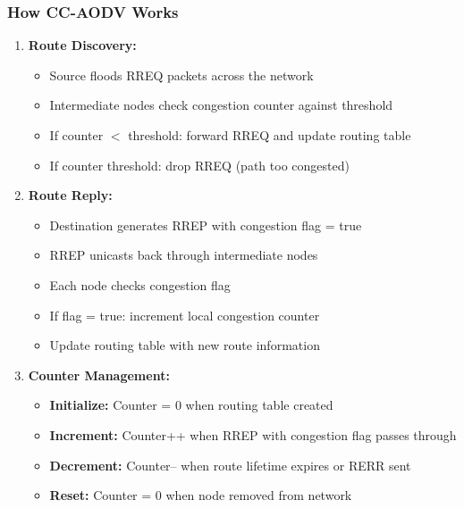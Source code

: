 \documentclass[12pt,a4paper]{article}
\begin{document}
\subsubsection{How CC-AODV Works}
\begin{enumerate}
    \item \textbf{Route Discovery:}
    \begin{itemize}
        \item Source floods RREQ packets across the network
        \item Intermediate nodes check congestion counter against threshold
        \item If counter $<$ threshold: forward RREQ and update routing table
        \item If counter \geq threshold: drop RREQ (path too congested)
    \end{itemize}
    
    \item \textbf{Route Reply:}
    \begin{itemize}
        \item Destination generates RREP with congestion flag = true
        \item RREP unicasts back through intermediate nodes
        \item Each node checks congestion flag
        \item If flag = true: increment local congestion counter
        \item Update routing table with new route information
    \end{itemize}
    
    \item \textbf{Counter Management:}
    \begin{itemize}
        \item \textbf{Initialize:} Counter = 0 when routing table created
        \item \textbf{Increment:} Counter++ when RREP with congestion flag passes through
        \item \textbf{Decrement:} Counter-- when route lifetime expires or RERR sent
        \item \textbf{Reset:} Counter = 0 when node removed from network
    \end{itemize}
\end{enumerate}
\end{document}
